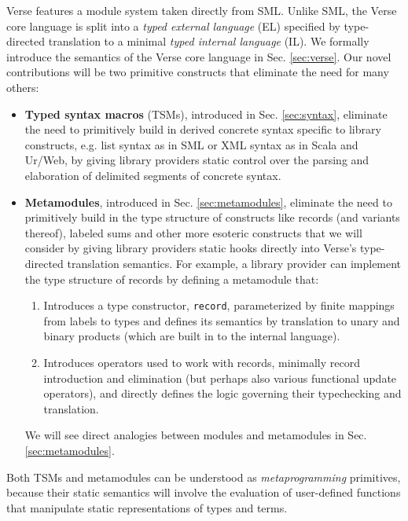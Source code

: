 Verse features a module system taken directly from  SML. Unlike SML, the Verse core language is split into a \emph{typed external language} (EL) specified by {type-directed translation} to a minimal \emph{typed internal language} (IL). We formally introduce the semantics of the Verse core language in Sec. \ref{sec:verse}. Our novel contributions will be two primitive constructs that eliminate the need for many others:
\begin{itemize}
\item \textbf{Typed syntax macros} (TSMs), introduced in Sec. \ref{sec:syntax}, eliminate the need to primitively build in derived concrete syntax specific to library constructs, e.g. list syntax as in SML or XML syntax as in Scala and Ur/Web, by giving library providers static control over the parsing and elaboration of delimited segments of concrete syntax. %
\item \textbf{Metamodules}, introduced in Sec. \ref{sec:metamodules}, eliminate the need to primitively build in the type structure of constructs like records (and variants thereof),  labeled sums and other more esoteric constructs that we will consider by giving library providers static hooks directly into Verse's type-directed translation semantics. For example, a library provider can implement the type structure of records by defining a metamodule that:
\begin{enumerate}
\item Introduces a type constructor, \lstinline{record}, parameterized by finite mappings from labels to types and defines its semantics by translation to unary and binary products (which are built in to the internal language).
\item Introduces operators used to work with records, minimally record introduction and elimination (but perhaps also various functional update operators), and directly defines the logic governing their typechecking and translation. 
\end{enumerate}
We will see direct analogies between modules and metamodules in Sec. \ref{sec:metamodules}.
\end{itemize} 
Both TSMs and metamodules can be understood as \emph{metaprogramming} primitives, because their static semantics will involve the evaluation of user-defined functions that manipulate static representations of types and terms.%

